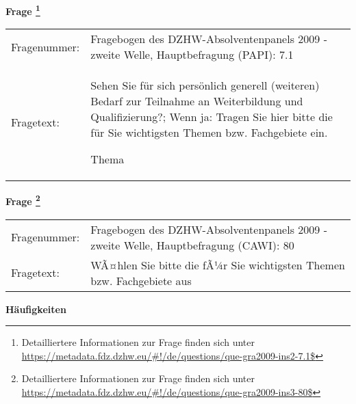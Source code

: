				\vspace*{0.5cm}
                \noindent\textbf{Frage
	                \footnote{Detailliertere Informationen zur Frage finden sich unter
		              \url{https://metadata.fdz.dzhw.eu/\#!/de/questions/que-gra2009-ins2-7.1$}}}\\
				\begin{tabularx}{\hsize}{@{}lX}
					Fragenummer: &
					  Fragebogen des DZHW-Absolventenpanels 2009 - zweite Welle, Hauptbefragung (PAPI):
					  7.1
 \\
					Fragetext: & Sehen Sie für sich persönlich generell (weiteren) Bedarf zur Teilnahme an Weiterbildung und Qualifizierung?; Wenn ja: Tragen Sie hier bitte die für Sie wichtigsten Themen bzw. Fachgebiete ein.\par  Thema \\
				\end{tabularx}
				\vspace*{0.5cm}
                \noindent\textbf{Frage
	                \footnote{Detailliertere Informationen zur Frage finden sich unter
		              \url{https://metadata.fdz.dzhw.eu/\#!/de/questions/que-gra2009-ins3-80$}}}\\
				\begin{tabularx}{\hsize}{@{}lX}
					Fragenummer: &
					  Fragebogen des DZHW-Absolventenpanels 2009 - zweite Welle, Hauptbefragung (CAWI):
					  80
 \\
					Fragetext: & WÃ¤hlen Sie bitte die fÃ¼r Sie wichtigsten Themen bzw. Fachgebiete aus \\
				\end{tabularx}





        		\vspace*{0.5cm}
                \noindent\textbf{Häufigkeiten}

